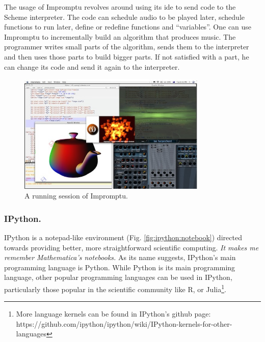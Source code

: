 \documentclass{./llncs2e/llncs}
\begin{document}
	The usage of Impromptu revolves around using its \ac{ide} to send code to the Scheme interpreter. 
	The code can schedule audio to be played later, schedule functions to run later, define or redefine functions and ``variables''. 
	One can use Impromptu to incrementally build an algorithm that produces music. 
	The programmer writes small parts of the algorithm, sends them to the interpreter and then uses those parts to build bigger parts. 
	If not satisfied with a part, he can change its code and send it again to the interpreter.
	
	\begin{figure}
		\centering
		\includegraphics[width=0.8\textwidth]{img/impromptu_example}
		\caption{A running session of Impromptu.}
		\label{fig:ex:impromptu}
	\end{figure}
	
	
\subsubsection{IPython.}
	IPython\cite{PER-GRA:2007} is a notepad-like environment (Fig. \ref{fig:ipython:notebook}) directed towards providing better, more straightforward scientific computing. \emph{It makes me remember Mathematica's notebooks.} As its name suggests, IPython's main programming language is Python. 
	While Python is its main programming language, other popular programming languages can be used in IPython, particularly those popular in the scientific community like R, or Julia\footnote{More language kernels can be found in IPython's github page: https://github.com/ipython/ipython/wiki/IPython-kernels-for-other-languages}.
	
\end{document}
